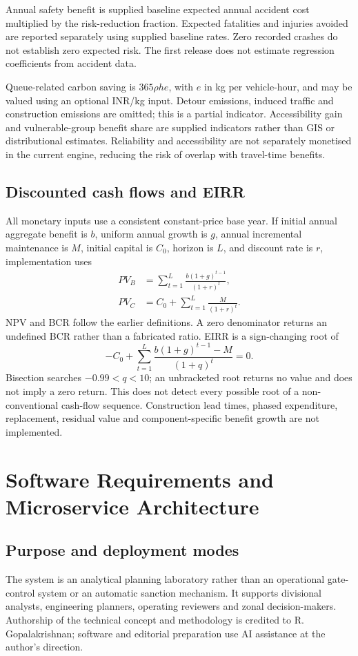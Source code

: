 \documentclass[11pt,a4paper]{article}
\begin{document}
Annual safety benefit is supplied baseline expected annual accident cost multiplied by the risk-reduction fraction. Expected fatalities and injuries avoided are reported separately using supplied baseline rates. Zero recorded crashes do not establish zero expected risk. The first release does not estimate regression coefficients from accident data.

Queue-related carbon saving is $365\rho h e$, with $e$ in kg per vehicle-hour, and may be valued using an optional INR/kg input. Detour emissions, induced traffic and construction emissions are omitted; this is a partial indicator. Accessibility gain and vulnerable-group benefit share are supplied indicators rather than GIS or distributional estimates. Reliability and accessibility are not separately monetised in the current engine, reducing the risk of overlap with travel-time benefits.

\subsection{Discounted cash flows and EIRR}
All monetary inputs use a consistent constant-price base year. If initial annual aggregate benefit is $b$, uniform annual growth is $g$, annual incremental maintenance is $M$, initial capital is $C_0$, horizon is $L$, and discount rate is $r$, implementation uses
\begin{align}
 PV_B&=\sum_{t=1}^{L}\frac{b(1+g)^{t-1}}{(1+r)^t},\\
 PV_C&=C_0+\sum_{t=1}^{L}\frac{M}{(1+r)^t}.
\end{align}
NPV and BCR follow the earlier definitions. A zero denominator returns an undefined BCR rather than a fabricated ratio. EIRR is a sign-changing root of
\begin{equation}
 -C_0+\sum_{t=1}^{L}\frac{b(1+g)^{t-1}-M}{(1+q)^t}=0.
\end{equation}
Bisection searches $-0.99<q<10$; an unbracketed root returns no value and does not imply a zero return. This does not detect every possible root of a non-conventional cash-flow sequence. Construction lead times, phased expenditure, replacement, residual value and component-specific benefit growth are not implemented.

\section{Software Requirements and Microservice Architecture}
\subsection{Purpose and deployment modes}
The system is an analytical planning laboratory rather than an operational gate-control system or an automatic sanction mechanism. It supports divisional analysts, engineering planners, operating reviewers and zonal decision-makers. Authorship of the technical concept and methodology is credited to R. Gopalakrishnan; software and editorial preparation use AI assistance at the author's direction.
\end{document}
